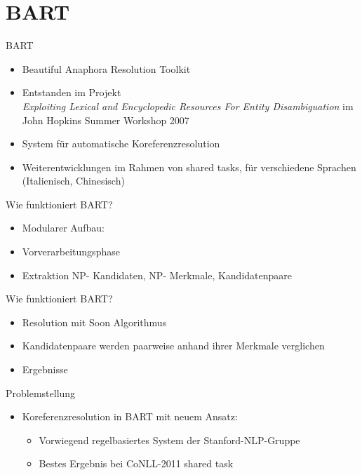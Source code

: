 \documentclass[11pt,a4paper]{beamer}
\begin{document}
\section{BART}
\begin{frame}{BART}
\begin{itemize}
\item Beautiful Anaphora Resolution Toolkit
\item Entstanden im Projekt\\ \textit{Exploiting Lexical and Encyclopedic Resources For Entity Disambiguation} 
im John Hopkins Summer Workshop 2007
\item System für automatische Koreferenzresolution
\item Weiterentwicklungen im Rahmen von shared tasks, für verschiedene Sprachen (Italienisch, Chinesisch)
\end{itemize}
\end{frame}

\begin{frame}{Wie funktioniert BART?}
\begin{itemize}
\item Modularer Aufbau: 
\item Vorverarbeitungsphase
\item Extraktion NP- Kandidaten, NP- Merkmale, Kandidatenpaare
\end{itemize}
\end{frame}

\begin{frame}{Wie funktioniert BART?}
\begin{itemize}
\item Resolution mit Soon Algorithmus 
\item Kandidatenpaare werden paarweise anhand ihrer Merkmale verglichen
\item Ergebnisse
\end{itemize}
\end{frame}

\begin{frame}{Problemstellung}
\begin{itemize}
\item Koreferenzresolution in BART mit neuem Ansatz: 
\begin{itemize}
\item Vorwiegend regelbasiertes System der Stanford-NLP-Gruppe
\item Bestes Ergebnis bei CoNLL-2011 shared task
\end{itemize}
\end{itemize}
\end{frame}
\end{document}
